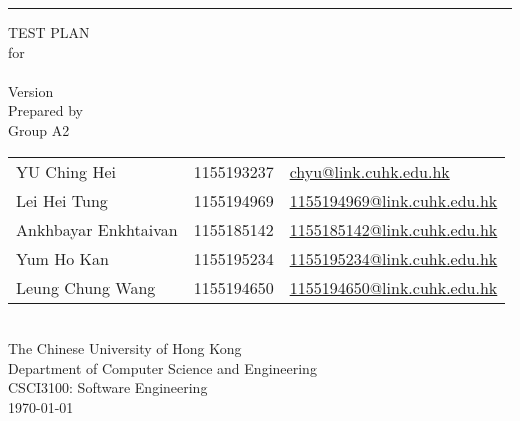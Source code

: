 \documentclass[a4paper,11pt]{scrartcl}
\begin{document}

\begin{titlepage}
    \begin{flushright}
        \rule{\textwidth}{5pt}\vskip1cm
        \begin{bfseries}
            \Huge{TEST PLAN}\\
            \vspace{1.6cm}
            for\\
            \vspace{1.6cm}
            \projectname\\
            \vspace{1.6cm}
            \LARGE{Version \myversion}\\
            \vspace{1.6cm}
            Prepared by\\
            Group A2\\
            \Large{
                \begin{tabularx}{\textwidth}{l l >{\raggedleft\arraybackslash}X}
                    YU Ching Hei & 1155193237 & \href{mailto:chyu@link.cuhk.edu.hk}{chyu@link.cuhk.edu.hk}\\
                    Lei Hei Tung & 1155194969 & \href{mailto:1155194969@link.cuhk.edu.hk}{1155194969@link.cuhk.edu.hk}\\
                    Ankhbayar Enkhtaivan & 1155185142 & \href{mailto:1155185142@link.cuhk.edu.hk}{1155185142@link.cuhk.edu.hk}\\
                    Yum Ho Kan & 1155195234 & \href{mailto:1155195234@link.cuhk.edu.hk}{1155195234@link.cuhk.edu.hk}\\
                    Leung Chung Wang & 1155194650 & \href{mailto:1155194650@link.cuhk.edu.hk}{1155194650@link.cuhk.edu.hk}\\
                \end{tabularx}
            }\\
            \vspace{1.6cm}
            The Chinese University of Hong Kong\\
            Department of Computer Science and Engineering\\
            CSCI3100: Software Engineering\\
            \vspace{1.6cm}
            \today\\
        \end{bfseries}
    \end{flushright}
\end{titlepage}
\end{document}
